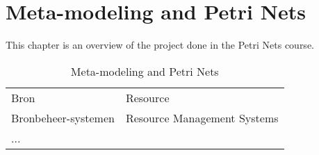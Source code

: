 \chapter{Meta-modeling and Petri Nets}
 
This chapter is an overview of the project done in the Petri Nets course.

\begin{table}[h]
\centering \begin{tabular}[]{l|l}
Bron & Resource \\
Bronbeheer-systemen & Resource Management Systems \\
...
\end{tabular}
\caption{Meta-modeling and Petri Nets}
\end{table}